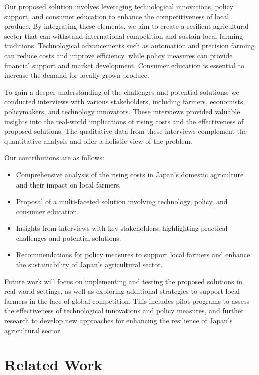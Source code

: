 \documentclass{article} %
\begin{document}
Our proposed solution involves leveraging technological innovations, policy support, and consumer education to enhance the competitiveness of local produce. By integrating these elements, we aim to create a resilient agricultural sector that can withstand international competition and sustain local farming traditions. Technological advancements such as automation and precision farming can reduce costs and improve efficiency, while policy measures can provide financial support and market development. Consumer education is essential to increase the demand for locally grown produce.

To gain a deeper understanding of the challenges and potential solutions, we conducted interviews with various stakeholders, including farmers, economists, policymakers, and technology innovators. These interviews provided valuable insights into the real-world implications of rising costs and the effectiveness of proposed solutions. The qualitative data from these interviews complement the quantitative analysis and offer a holistic view of the problem.

Our contributions are as follows:
\begin{itemize}
    \item Comprehensive analysis of the rising costs in Japan's domestic agriculture and their impact on local farmers.
    \item Proposal of a multi-faceted solution involving technology, policy, and consumer education.
    \item Insights from interviews with key stakeholders, highlighting practical challenges and potential solutions.
    \item Recommendations for policy measures to support local farmers and enhance the sustainability of Japan's agricultural sector.
\end{itemize}

Future work will focus on implementing and testing the proposed solutions in real-world settings, as well as exploring additional strategies to support local farmers in the face of global competition. This includes pilot programs to assess the effectiveness of technological innovations and policy measures, and further research to develop new approaches for enhancing the resilience of Japan's agricultural sector.

\section{Related Work}
\label{sec:related}
\end{document}
